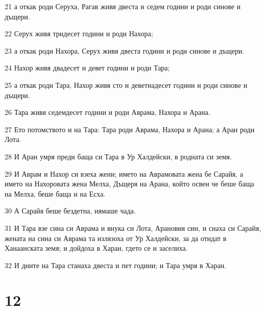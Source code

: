 \par 21 а откак роди Серуха, Рагав живя двеста и седем години и роди синове и дъщери.
\par 22 Серух живя тридесет години и роди Нахора;
\par 23 а откак роди Нахора, Серух живя двеста години и роди синове и дъщери.
\par 24 Нахор живя двадесет и девет години и роди Тара;
\par 25 а откак роди Тара, Нахор живя сто и деветнадесет години и роди синове и дъщери.
\par 26 Тара живя седемдесет години и роди Аврама, Нахора и Арана.
\par 27 Ето потомството и на Тара: Тара роди Аврама, Нахора и Арана; а Аран роди Лота.
\par 28 И Аран умря преди баща си Тара в Ур Халдейски, в родната си земя.
\par 29 И Аврам и Нахор си взеха жени; името на Аврамовата жена бе Сарайя, а името на Нахоровата жена Мелха, Дъщеря на Арана, който освен че беше баща на Мелха, беше баща и на Есха.
\par 30 А Сарайя беше бездетна, нямаше чада.
\par 31 И Тара взе сина си Аврама и внука си Лота, Арановия син, и снаха си Сарайя, жената на сина си Аврама та излязоха от Ур Халдейски, за да отидат в Ханаанската земя; и дойдоха в Харан, гдето се и заселиха.
\par 32 И дните на Тара станаха двеста и пет години; и Тара умря в Харан.

\chapter{12}

